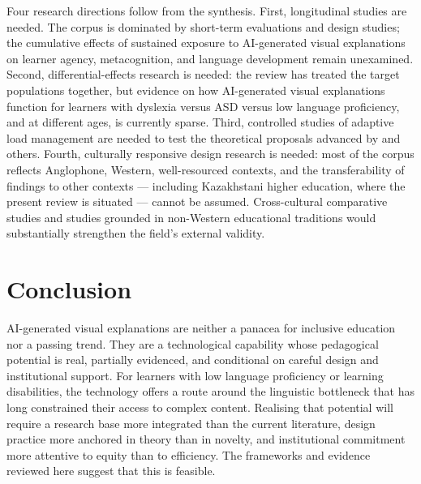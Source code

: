 Four research directions follow from the synthesis. First, longitudinal studies are needed. The corpus is dominated by short-term evaluations and design studies; the cumulative effects of sustained exposure to AI-generated visual explanations on learner agency, metacognition, and language development remain unexamined. Second, differential-effects research is needed: the review has treated the target populations together, but evidence on how AI-generated visual explanations function for learners with dyslexia versus ASD versus low language proficiency, and at different ages, is currently sparse. Third, controlled studies of adaptive load management are needed to test the theoretical proposals advanced by \citet{twabu2025} and others. Fourth, culturally responsive design research is needed: most of the corpus reflects Anglophone, Western, well-resourced contexts, and the transferability of findings to other contexts --- including Kazakhstani higher education, where the present review is situated --- cannot be assumed. Cross-cultural comparative studies and studies grounded in non-Western educational traditions would substantially strengthen the field's external validity.

\section{Conclusion}

AI-generated visual explanations are neither a panacea for inclusive education nor a passing trend. They are a technological capability whose pedagogical potential is real, partially evidenced, and conditional on careful design and institutional support. For learners with low language proficiency or learning disabilities, the technology offers a route around the linguistic bottleneck that has long constrained their access to complex content. Realising that potential will require a research base more integrated than the current literature, design practice more anchored in theory than in novelty, and institutional commitment more attentive to equity than to efficiency. The frameworks and evidence reviewed here suggest that this is feasible.
